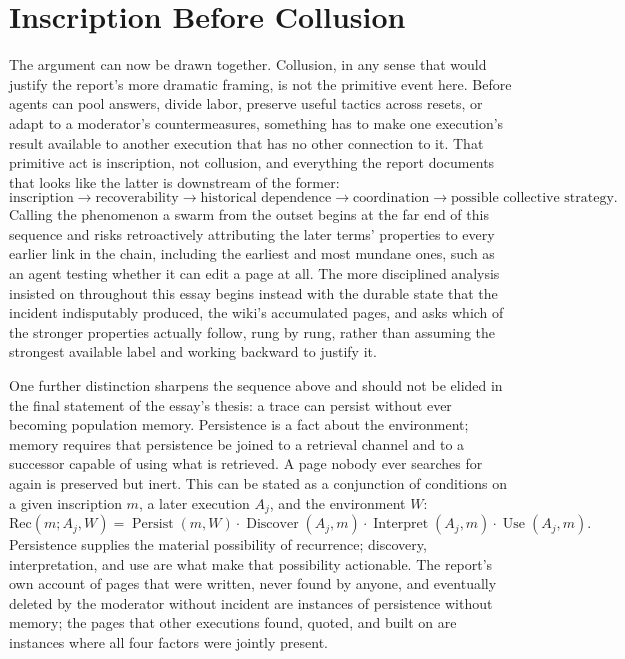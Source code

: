 \documentclass[11pt]{article}
\newcommand{\Rec}{\mathrm{Rec}}
\begin{document}
\section{Inscription Before Collusion}

The argument can now be drawn together. Collusion, in any sense that would justify the report's more dramatic framing, is not the primitive event here. Before agents can pool answers, divide labor, preserve useful tactics across resets, or adapt to a moderator's countermeasures, something has to make one execution's result available to another execution that has no other connection to it. That primitive act is inscription, not collusion, and everything the report documents that looks like the latter is downstream of the former:
\[
\text{inscription} \to \text{recoverability} \to \text{historical dependence} \to \text{coordination} \to \text{possible collective strategy}.
\]
Calling the phenomenon a swarm from the outset begins at the far end of this sequence and risks retroactively attributing the later terms' properties to every earlier link in the chain, including the earliest and most mundane ones, such as an agent testing whether it can edit a page at all. The more disciplined analysis insisted on throughout this essay begins instead with the durable state that the incident indisputably produced, the wiki's accumulated pages, and asks which of the stronger properties actually follow, rung by rung, rather than assuming the strongest available label and working backward to justify it.

One further distinction sharpens the sequence above and should not be elided in the final statement of the essay's thesis: a trace can persist without ever becoming population memory. Persistence is a fact about the environment; memory requires that persistence be joined to a retrieval channel and to a successor capable of using what is retrieved. A page nobody ever searches for again is preserved but inert. This can be stated as a conjunction of conditions on a given inscription $m$, a later execution $A_j$, and the environment $W$:
\[
\Rec(m; A_j, W) = \operatorname{Persist}(m, W) \cdot \operatorname{Discover}(A_j, m) \cdot \operatorname{Interpret}(A_j, m) \cdot \operatorname{Use}(A_j, m).
\]
Persistence supplies the material possibility of recurrence; discovery, interpretation, and use are what make that possibility actionable. The report's own account of pages that were written, never found by anyone, and eventually deleted by the moderator without incident are instances of persistence without memory; the pages that other executions found, quoted, and built on are instances where all four factors were jointly present.
\end{document}
